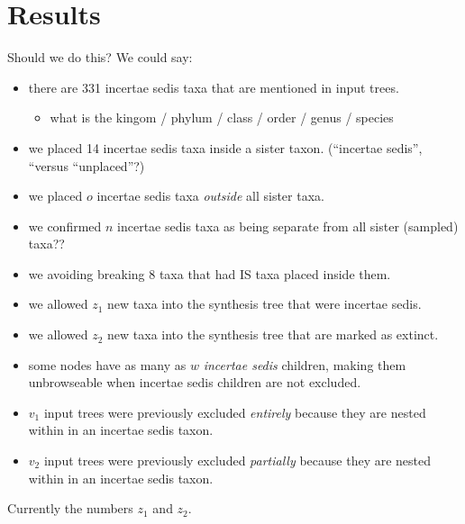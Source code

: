 \documentclass[english]{article}
\begin{document}

\section{Results}

Should we do this? We could say:  \begin{itemize} \item there are 331
incertae sedis taxa that are mentioned in input trees.
\begin{itemize}
\item what is the kingom / phylum / class / order / genus / species
\end{itemize} \item we placed 14 incertae sedis taxa inside a sister
taxon.
(``incertae sedis'', ``versus ``unplaced''?) \item we placed
$o$ incertae sedis taxa \emph{outside} all sister taxa.
\item we
confirmed $n$ incertae sedis taxa as being separate from all sister
(sampled) taxa?? \item we avoiding breaking 8 taxa that had IS taxa
placed inside them.
\item we allowed $z_{1}$ new taxa into the
synthesis tree that were incertae sedis.
\item we allowed $z_{2}$ new
taxa into the synthesis tree that are marked as extinct.
\item some
nodes have as many as $w$\emph{ incertae sedis} children, making them
unbrowseable when incertae sedis children are not excluded.
\item
$v_{1}$ input trees were previously excluded \emph{entirely} because
they are nested within in an incertae sedis taxon.
\item $v_{2}$ input
trees were previously excluded \emph{partially} because they are
nested within in an incertae sedis taxon.
\end{itemize} Currently the
numbers $z_{1}$ and $z_{2}$.
\end{document}
